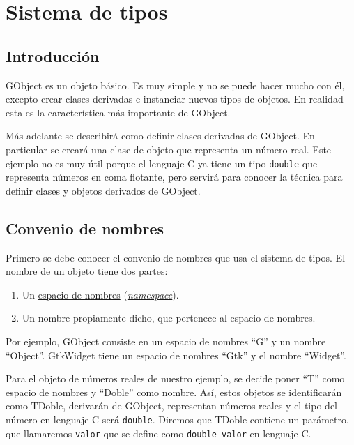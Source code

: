 %

\section{Sistema de tipos}
\subsection{Introducción}
\textsf{GObject} es un objeto básico. Es muy simple y no se puede hacer mucho con él, excepto crear
clases derivadas e instanciar nuevos tipos de objetos.
En realidad esta es la característica más importante de \textsf{GObject}.

Más adelante se describirá como definir clases derivadas de \textsf{GObject}.
En particular se creará una clase de objeto  que representa un número real.
Este ejemplo no es muy útil porque el lenguaje C ya tiene un tipo \texttt{double} que representa
números en coma flotante, pero servirá para conocer la técnica para definir clases y objetos derivados de \textsf{GObject}.

\subsection{Convenio de nombres}
Primero se debe conocer el convenio de nombres que usa el sistema de tipos.
El nombre de un objeto tiene dos partes:
\begin{enumerate}
  \tightlist
\item Un \href{https://es.wikipedia.org/wiki/Espacio_de_nombres}{espacio de nombres}
  (\href{https://en.wikipedia.org/wiki/Namespace}{\textit{namespace}}).
\item Un nombre propiamente dicho, que pertenece al espacio de nombres.
\end{enumerate}

Por ejemplo, \textsf{GObject} consiste en un espacio de nombres ``\textsf{G}'' y un nombre ``\textsf{Object}''.
\textsf{GtkWidget} tiene un espacio de nombres ``\textsf{Gtk}'' y el nombre ``\textsf{Widget}''.

Para el objeto de números reales de nuestro ejemplo, se decide poner ``\textsf{T}'' como espacio
de nombres y ``\textsf{Doble}'' como nombre. Así, estos objetos se identificarán como \textsf{TDoble},
derivarán de \textsf{GObject}, representan números reales y el tipo del número en
lenguaje C será \texttt{double}. Diremos que \textsf{TDoble} contiene un parámetro, que llamaremos
\texttt{valor} que se  define como \texttt{double valor} en lenguaje C.

